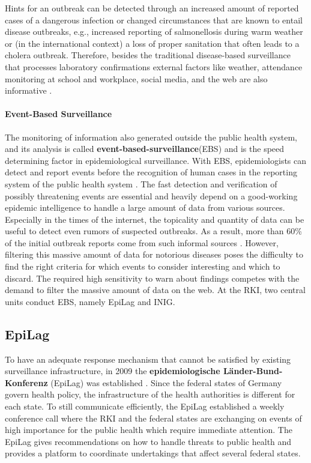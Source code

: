 Hints for an outbreak can be detected through an increased amount of reported cases of a dangerous infection or changed circumstances that are known to entail disease outbreaks, e.g., increased reporting of salmonellosis during warm weather or (in the international context) a loss of proper sanitation that often leads to a cholera outbreak.
Therefore, besides the traditional disease-based surveillance that processes laboratory confirmations external factors like weather, attendance monitoring at school and workplace, social media, and the web are also informative \citep{EarlyDetection}.

\paragraph{Event-Based Surveillance}
The monitoring of information also generated outside the public health system, and its analysis is called \textbf{event-based-surveillance}(\gls{EBS}) and is the speed determining factor in epidemiological surveillance.
With EBS, epidemiologists can detect and report events before the recognition of human cases in the reporting system of the public health system \citep{EarlyDetection}.
The fast detection and verification of possibly threatening events are essential and heavily depend on a good-working epidemic intelligence to handle a large amount of data from various sources.
Especially in the times of the internet, the topicality and quantity of data can be useful to detect even rumors of suspected outbreaks.
As a result, more than 60\% of the initial outbreak reports come from such informal sources \citep{EpiSurv}.
However, filtering this massive amount of data for notorious diseases poses the difficulty to find the right criteria for which events to consider interesting and which to discard.
The required high sensitivity to warn about findings competes with the demand to filter the massive amount of data on the web.
At the RKI, two central units conduct EBS, namely EpiLag and INIG.

\subsection{EpiLag}
To have an adequate response mechanism that cannot be satisfied by existing surveillance infrastructure, in 2009 the \textbf{epidemiologische L\"ander-Bund-Konferenz} (\gls{EpiLag}) was established \citep{Mohr2010}.
Since the federal states of Germany govern health policy, the infrastructure of the health authorities is different for each state.
To still communicate efficiently, the EpiLag established a weekly conference call where the RKI and the federal states are exchanging on events of high importance for the public health which require immediate attention.
The EpiLag gives recommendations on how to handle threats to public health and provides a platform to coordinate undertakings that affect several federal states.

